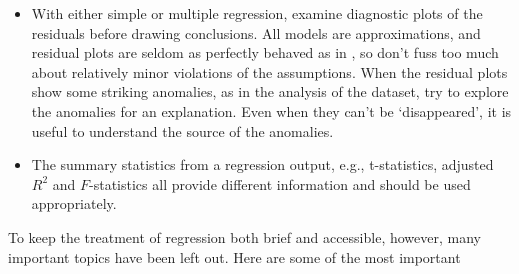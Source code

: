 \begin{itemize}
	\item  With either simple or multiple regression, examine diagnostic plots of the residuals before drawing conclusions.  All models are approximations, and residual plots are seldom as perfectly behaved as in , so don't fuss too much about relatively minor violations of the assumptions.  When the residual plots show some striking anomalies, as in the analysis of the  dataset, try to explore the anomalies for an explanation.  Even when they can't be `disappeared', it is useful to understand the source of the anomalies.
	
	\item  The summary statistics from a regression output, e.g., t-statistics, adjusted $R^2$ and $F$-statistics all provide different information and should be used appropriately.

\end{itemize}

To keep the treatment of regression both brief and accessible, however, many important topics have been left out.  Here are some of the most important

